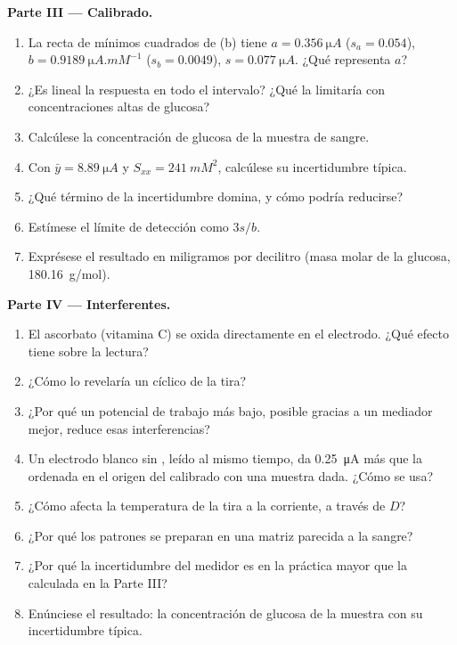 \begin{problem}
\medskip\noindent\textbf{Parte III --- Calibrado.}
\begin{enumerate}[resume]
  \item La recta de mínimos cuadrados de (b) tiene $a = \qty{0.356}{\micro A}$ ($s_a = 0.054$), $b =
        \qty{0.9189}{\micro A.mM^{-1}}$ ($s_b = 0.0049$), $s = \qty{0.077}{\micro A}$. ¿Qué representa $a$?
  \item ¿Es lineal la respuesta en todo el intervalo? ¿Qué la limitaría con concentraciones altas de
        glucosa?
  \item Calcúlese la concentración de glucosa de la muestra de sangre.
  \item Con $\bar y = \qty{8.89}{\micro A}$ y $S_{xx} = \qty{241}{mM^2}$, calcúlese su incertidumbre típica.
  \item ¿Qué término de la incertidumbre domina, y cómo podría reducirse?
  \item Estímese el límite de detección como $3s/b$.
  \item Exprésese el resultado en miligramos por decilitro (masa molar de la glucosa,
        \qty{180.16}{g/mol}).
\end{enumerate}

\medskip\noindent\textbf{Parte IV --- Interferentes.}
\begin{enumerate}[resume]
  \item El ascorbato (vitamina C) se oxida directamente en el electrodo. ¿Qué efecto
        tiene sobre la lectura?
  \item ¿Cómo lo revelaría un  cíclico de la tira?
  \item ¿Por qué un potencial de trabajo más bajo, posible gracias a un mediador mejor,
        reduce esas interferencias?
  \item Un electrodo blanco sin , leído al mismo tiempo, da
        \qty{0.25}{\micro A} más que la ordenada en el origen del calibrado con una muestra dada. ¿Cómo
        se usa?
  \item ¿Cómo afecta la temperatura de la tira a la corriente, a través de $D$?
  \item ¿Por qué los patrones se preparan en una matriz parecida a la sangre?
  \item ¿Por qué la incertidumbre del medidor es en la práctica mayor que la
        calculada en la Parte III?
  \item Enúnciese el resultado: la concentración de glucosa de la muestra con su
        incertidumbre típica.
\end{enumerate}
\end{problem}
